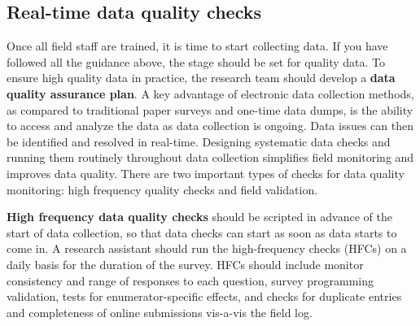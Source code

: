\subsection{Real-time data quality checks}
Once all field staff are trained, it is time to start collecting data.
If you have followed all the guidance above, the stage should be set for quality data.
To ensure high quality data in practice, 
the research team should develop a \textbf{data quality assurance plan}.
A key advantage of electronic data collection methods,
as compared to traditional paper surveys and one-time data dumps,
is the ability to access and analyze the data as data collection is ongoing.
Data issues can then be identified and resolved in real-time.
Designing systematic data checks and running them routinely throughout data collection
simplifies field monitoring and improves data quality.
There are two important types of checks for data quality monitoring: 
high frequency quality checks and field validation.

\textbf{High frequency data quality checks} should be scripted 
in advance of the start of data collection,
so that data checks can start as soon as data starts to come in. 
A research assistant should run the high-frequency checks (HFCs) on a daily basis 
for the duration of the survey.
HFCs should include monitor consistency and range of responses to each question, 
survey programming validation, tests for enumerator-specific effects, 
and checks for duplicate entries and completeness of online submissions vis-a-vis the field log.

